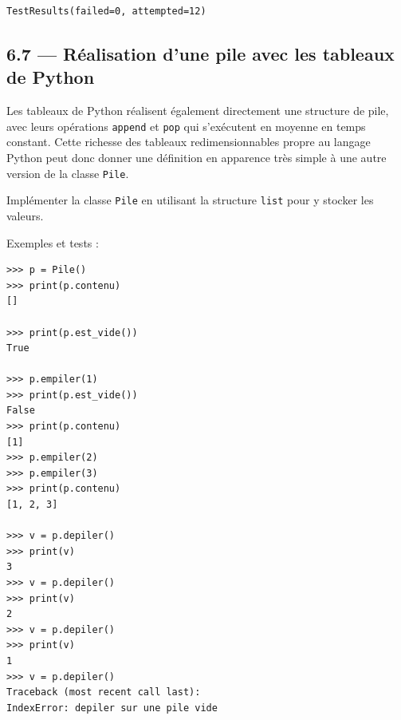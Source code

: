 \documentclass[a4paper,17pt]{extarticle}
\makeatletter
\newcommand{\boxspacing}{\kern\kvtcb@left@rule\kern\kvtcb@boxsep}
\newcommand{\prompt}[4]{
        \ttfamily\llap{{\color{#2}[#3]:\hspace{3pt}#4}}\vspace{-\baselineskip}
    }
\makeatother
\begin{document}
            \begin{tcolorbox}[breakable, size=fbox, boxrule=.5pt, pad at break*=1mm, opacityfill=0]
\prompt{Out}{outcolor}{8}{\boxspacing}
\begin{Verbatim}[commandchars=\\\{\}]
TestResults(failed=0, attempted=12)
\end{Verbatim}
\end{tcolorbox}
        
    \hypertarget{ruxe9alisation-dune-pile-avec-les-tableaux-de-python}{%
\subsection{6.7 --- Réalisation d'une pile avec les tableaux de
Python}\label{ruxe9alisation-dune-pile-avec-les-tableaux-de-python}}

    Les tableaux de Python réalisent également directement une structure de
pile, avec leurs opérations \texttt{append} et \texttt{pop} qui
s'exécutent en moyenne en temps constant. Cette richesse des tableaux
redimensionnables propre au langage Python peut donc donner une
définition en apparence très simple à une autre version de la classe
\texttt{Pile}.

Implémenter la classe \texttt{Pile} en utilisant la structure
\texttt{list} pour y stocker les valeurs.

Exemples et tests :

\begin{verbatim}
>>> p = Pile()
>>> print(p.contenu)
[]

>>> print(p.est_vide())
True

>>> p.empiler(1)
>>> print(p.est_vide())
False
>>> print(p.contenu)
[1]
>>> p.empiler(2)
>>> p.empiler(3)
>>> print(p.contenu)
[1, 2, 3]

>>> v = p.depiler()
>>> print(v)
3
>>> v = p.depiler()
>>> print(v)
2
>>> v = p.depiler()
>>> print(v)
1
>>> v = p.depiler()
Traceback (most recent call last):
IndexError: depiler sur une pile vide
 
\end{verbatim}
\end{document}

